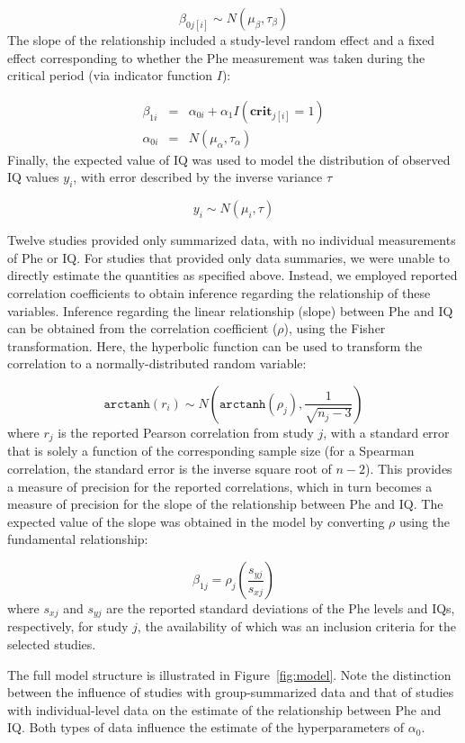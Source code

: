 \documentclass{svjour3}                     %
\begin{document}
\[
    \beta_{0j[i]} \sim N(\mu_{\beta}, \tau_{\beta})
\]
The slope of the relationship included a study-level random effect and a fixed effect corresponding to whether the Phe measurement was taken during the critical period (via indicator function $I$):

\begin{eqnarray*}
    \beta_{1i} &=& \alpha_{0i} + \alpha_1 I(\textbf{crit}_{j[i]}=1) \\
    \alpha_{0i} &=& N(\mu_{\alpha},\tau_{\alpha})
\end{eqnarray*}
Finally, the expected value of IQ was used to model the distribution of observed IQ values $y_i$, with error described by the inverse variance $\tau$

\[
    y_i \sim N(\mu_i,\tau)
\]

Twelve studies provided only summarized data, with no individual measurements of Phe or IQ. For studies that provided only data summaries, we were unable to directly estimate the quantities as specified above. Instead, we employed reported correlation coefficients to obtain inference regarding the relationship of these variables. Inference regarding the linear relationship (slope) between Phe and IQ can be obtained from the correlation coefficient ($\rho$), using the Fisher transformation. Here, the hyperbolic function can be used to transform the correlation to a normally-distributed random variable:

\[
    \texttt{arctanh}(r_i) \sim N \left( \texttt{arctanh}(\rho_j), \frac{1}{\sqrt{n_j - 3}} \right)
\]
where $r_j$ is the reported Pearson correlation from study $j$, with a standard error that is solely a function of the corresponding sample size (for a Spearman correlation, the standard error is the inverse square root of $n-2$). This provides a measure of precision for the reported correlations, which in turn becomes a measure of precision for the slope of the relationship between Phe and IQ. The expected value of the slope was obtained in the model by converting $\rho$ using the fundamental relationship:

\[
    \beta_{1j} = \rho_j \left( \frac{s_{yj}}{s_{xj}} \right)
\]
where $s_{xj}$ and $s_{yj}$ are the reported standard deviations of the Phe levels and IQs, respectively, for study $j$, the availability of which was an inclusion criteria for the selected studies.

The full model structure is illustrated in Figure~\ref{fig:model}. Note the distinction between the influence of studies with group-summarized data and that of studies with individual-level data on the estimate of the relationship between Phe and IQ. Both types of data influence the estimate of the hyperparameters of $\alpha_0$.
\end{document}
